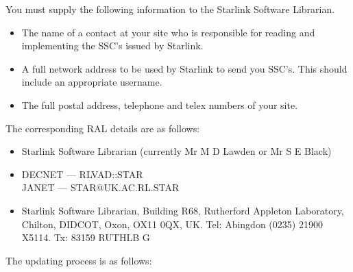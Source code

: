 You must supply the following information to the Starlink Software Librarian.
\begin{itemize}
\item The name of a contact at your site who is responsible for reading and
implementing the SSC's issued by Starlink.
\item A full network address to be used by Starlink to send you SSC's.
This should include an appropriate username.
\item The full postal address, telephone and telex numbers of your site.
\end{itemize}
The corresponding RAL details are as follows:
\begin{itemize}
\item Starlink Software Librarian (currently Mr M D Lawden or Mr S E Black)
\item DECNET --- RLVAD::STAR\\
JANET --- STAR@UK.AC.RL.STAR
\item Starlink Software Librarian, Building R68, Rutherford Appleton Laboratory,
Chilton, DIDCOT, Oxon, OX11 0QX, UK.
Tel: Abingdon (0235) 21900 X5114.
Tx: 83159 RUTHLB G
\end{itemize}
The updating process is as follows:
